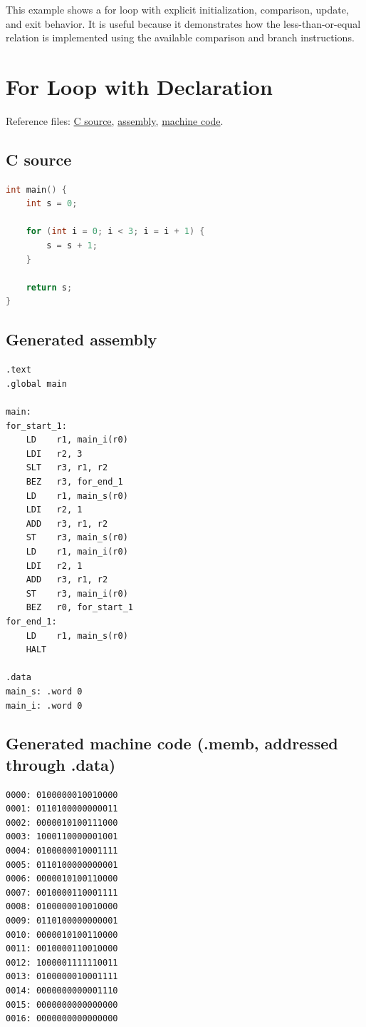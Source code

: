 \documentclass[12pt]{report}
\begin{document}
This example shows a for loop with explicit initialization, comparison, update, and exit behavior. It is useful because it demonstrates how the less-than-or-equal relation is implemented using the available comparison and branch instructions.

\section{For Loop with Declaration}
Reference files:
\href{https://github.com/shorewind/Custom-ISA-Toolchain/blob/main/tests/feature-check/control-flow/for-init-decl.c}{C source},
\href{https://github.com/shorewind/Custom-ISA-Toolchain/blob/main/tests/feature-check/control-flow/for-init-decl.s}{assembly},
\href{https://github.com/shorewind/Custom-ISA-Toolchain/blob/main/tests/feature-check/control-flow/for-init-decl.memb}{machine code}.

\subsection*{C source}
\begin{lstlisting}[language=C]
int main() {
    int s = 0;

    for (int i = 0; i < 3; i = i + 1) {
        s = s + 1;
    }

    return s;
}
\end{lstlisting}

\subsection*{Generated assembly}
\begin{lstlisting}[language=CustomISAAsm]
.text
.global main

main:
for_start_1:
    LD    r1, main_i(r0)
    LDI   r2, 3
    SLT   r3, r1, r2
    BEZ   r3, for_end_1
    LD    r1, main_s(r0)
    LDI   r2, 1
    ADD   r3, r1, r2
    ST    r3, main_s(r0)
    LD    r1, main_i(r0)
    LDI   r2, 1
    ADD   r3, r1, r2
    ST    r3, main_i(r0)
    BEZ   r0, for_start_1
for_end_1:
    LD    r1, main_s(r0)
    HALT

.data
main_s: .word 0
main_i: .word 0
\end{lstlisting}

\subsection*{Generated machine code (.memb, addressed through .data)}
\begin{lstlisting}
0000: 0100000010010000
0001: 0110100000000011
0002: 0000010100111000
0003: 1000110000001001
0004: 0100000010001111
0005: 0110100000000001
0006: 0000010100110000
0007: 0010000110001111
0008: 0100000010010000
0009: 0110100000000001
0010: 0000010100110000
0011: 0010000110010000
0012: 1000001111110011
0013: 0100000010001111
0014: 0000000000001110
0015: 0000000000000000
0016: 0000000000000000
\end{lstlisting}
\end{document}

